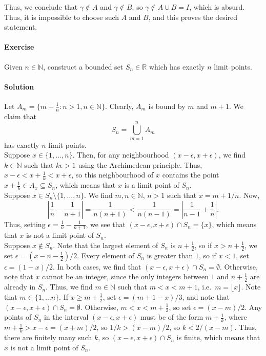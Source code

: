 \documentclass[10pt]{article}
\newcounter{prob}
\def\problem{\stepcounter{prob}\paragraph{Exercise \arabic{prob}}}
\def\solution{\paragraph{Solution}}
\begin{document}
        Thus, we conclude that $\gamma \notin A$ and $\gamma \notin B$, so $\gamma \notin A \cup B = I$, which is absurd.
        Thus, it is impossible to choose such $A$ and $B$, and this proves the desired statement.


        \problem Given $n \in \mathbb{N}$, construct a bounded set $S_n \in \mathbb{R}$ which has exactly $n$ limit points.

        \solution Let $A_m = \{m + \frac{1}{n}: n > 1, n \in \mathbb{N}\}$. Clearly, $A_m$ is bound by $m$ and $m + 1$. We claim that
        \[
                S_n = \bigcup_{m = 1}^n A_m
        \]
        has exactly $n$ limit points. \\
        
        Suppose $x \in \{1, \dots, n\}$. Then, for any neighbourhood $(x - \epsilon, x + \epsilon)$, we find $k \in \mathbb{N}$ such that
        $k\epsilon > 1$ using the Archimedean principle. Thus, $x - \epsilon < x + \frac{1}{k} < x + \epsilon$, so this neighbourhood
        of $x$ contains the point $x + \frac{1}{k} \in A_x \subseteq S_n$, which means that $x$ is a limit point of $S_n$. \\

        Suppose $x \in S_n\setminus\{1, \dots, n\}$. We find $m, n \in \mathbb{N}$, $n > 1$ such that $x = m + 1 /n$. Now,
        \[
                \left|\frac{1}{n} - \frac{1}{n+1}\right| = \frac{1}{n(n + 1)} < \frac{1}{n(n-1)} = \left|\frac{1}{n-1} + \frac{1}{n}\right|.
        \]
        Thus, setting $\epsilon = \frac{1}{n} - \frac{1}{n + 1}$, we see that $(x - \epsilon, x + \epsilon) \cap S_n = \{x\}$, which 
        means that $x$ is not a limit point of $S_n$. \\

        Suppose $x \notin S_n$. Note that the largest element of $S_n$ is $n + \frac{1}{2}$, so if $x > n + \frac{1}{2}$, we set
        $\epsilon = (x - n - \frac{1}{2}) /2$. Every element of $S_n$ is greater than $1$, so if $x < 1$, set $\epsilon = (1 - x)/2$.
        In both cases, we find that $(x - \epsilon, x + \epsilon) \cap S_n = \emptyset$.
        Otherwise, note that $x$ cannot be an integer, since the only integers between $1$ and $n + \frac{1}{2}$ are already in $S_n$.
        Thus, we find $m \in \mathbb{N}$ such that $m < x < m + 1$, i.e.\ $m = \lfloor x\rfloor$. Note that $m \in \{1, \dots n\}$.
        If $x \geq m + \frac{1}{2}$, set $\epsilon = (m + 1 - x) /3$, and note that $(x - \epsilon, x + \epsilon) \cap S_n = \emptyset$.
        Otherwise, $m < x < m + \frac{1}{2}$, so set $\epsilon = (x - m) /2$.
        Any points of $S_n$ in the interval $(x - \epsilon, x + \epsilon)$ must be of the form $m + \frac{1}{k}$,
        where $m + \frac{1}{k} > x - \epsilon = (x + m) /2$, so $1 /k > (x - m)/2$, so $k < 2 /(x - m)$. Thus, there are finitely many
        such $k$, so $(x - \epsilon, x + \epsilon) \cap S_n$ is finite, which means that $x$ is not a limit point of $S_n$. \\
        
\end{document}
